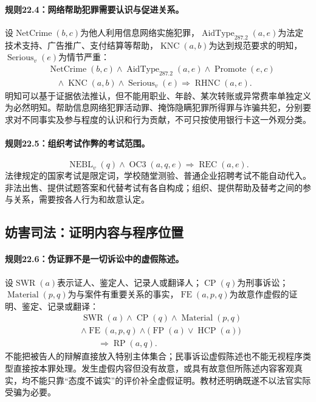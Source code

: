 \paragraph{规则22.4：网络帮助犯罪需要认识与促进关系。}
设$\operatorname{NetCrime}(b,c)$为他人利用信息网络实施犯罪，$\operatorname{AidType}_{287.2}(a,e)$为法定技术支持、广告推广、支付结算等帮助，$\operatorname{KNC}(a,b)$为达到规范要求的明知，$\operatorname{Serious}_v(e)$为情节严重：
\[
\begin{aligned}
&\operatorname{NetCrime}(b,c)\land\operatorname{AidType}_{287.2}(a,e)
\land\operatorname{Promote}(e,c)\\
&\quad\land\operatorname{KNC}(a,b)\land\operatorname{Serious}_v(e)
\Rightarrow\operatorname{RHNC}(a,e).
\end{aligned}
\]
明知可以基于证据依法推认，但不能用职业、年龄、某次转账或异常费率单独定义为必然明知。帮助信息网络犯罪活动罪、掩饰隐瞒犯罪所得罪与诈骗共犯，分别要求对不同事实及参与程度的认识和行为贡献，不可只按使用银行卡这一外观分类。

\paragraph{规则22.5：组织考试作弊的考试范围。}
\[
\operatorname{NEBL}_v(q)\land\operatorname{OC3}(a,q,e)
\Rightarrow\operatorname{REC}(a,e).
\]
法律规定的国家考试是限定词，学校随堂测验、普通企业招聘考试不能自动代入。非法出售、提供试题答案和代替考试有各自构成；组织、提供帮助及替考之间的参与关系，需要按各人行为和故意认定。

\subsection{妨害司法：证明内容与程序位置}
\paragraph{规则22.6：伪证罪不是一切诉讼中的虚假陈述。}
设$\operatorname{SWR}(a)$表示证人、鉴定人、记录人或翻译人；$\operatorname{CP}(q)$为刑事诉讼；$\operatorname{Material}(p,q)$为与案件有重要关系的事实，$\operatorname{FE}(a,p,q)$为故意作虚假的证明、鉴定、记录或翻译：
\[
\begin{aligned}
&\operatorname{SWR}(a)\land\operatorname{CP}(q)
\land\operatorname{Material}(p,q)\\
&\land\operatorname{FE}(a,p,q)
\land\bigl(\operatorname{FP}(a)\lor\operatorname{HCP}(a)\bigr)\\
&\qquad\Rightarrow\operatorname{RP}(a,q).
\end{aligned}
\]
不能把被告人的辩解直接放入特别主体集合；民事诉讼虚假陈述也不能无视程序类型直接按本罪处理。发生虚假内容但没有故意，或具有故意但所陈述内容客观真实，均不能只靠“态度不诚实”的评价补全虚假证明。教材还明确既遂不以法官实际受骗为必要。

